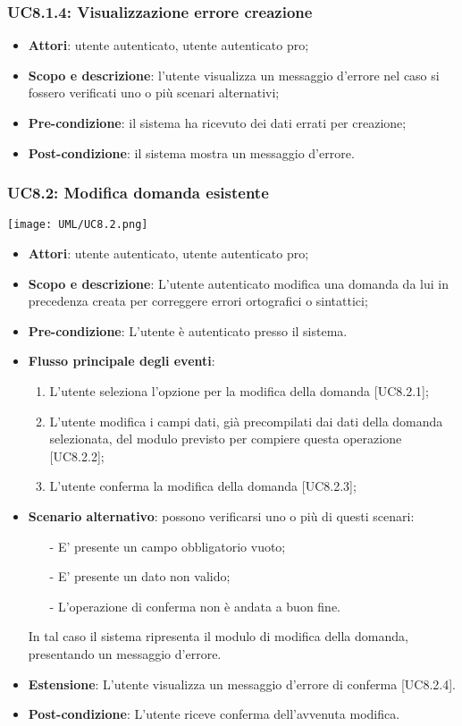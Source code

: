 	\subsubsection{UC8.1.4: Visualizzazione errore creazione}
	\begin{itemize}
		\item
			\textbf{Attori}: utente autenticato, utente autenticato pro;
		\item
			\textbf{Scopo e descrizione}: l'utente visualizza un messaggio d'errore nel caso si fossero verificati uno o più scenari alternativi;
		\item		
			\textbf{Pre-condizione}: il sistema ha ricevuto dei dati errati per creazione;
		\item
			\textbf{Post-condizione}: il sistema mostra un messaggio d'errore.
	\end{itemize}	
	\subsubsection{UC8.2: Modifica domanda esistente}
	\begin{center}
		\texttt{[image: UML/UC8.2.png]}
	\end{center}
	\begin{itemize}
		\item
			\textbf{Attori}: utente autenticato, utente autenticato pro;
		\item		
			\textbf{Scopo e descrizione}: L'utente autenticato modifica una domanda da lui in precedenza creata per correggere errori ortografici o sintattici;
		\item
			\textbf{Pre-condizione}: L'utente è autenticato presso il sistema. 
		\item
			\textbf{Flusso principale degli eventi}:
	       		\begin{enumerate}
					\item 	
					L'utente seleziona l'opzione per la modifica della domanda [UC8.2.1];
					\item
					L'utente modifica i campi dati, già precompilati dai dati della domanda selezionata, del modulo previsto per compiere questa operazione [UC8.2.2];
					\item
					L'utente conferma la modifica della domanda [UC8.2.3];
	 			\end{enumerate}
	 	\item
	 		\textbf{Scenario alternativo}: possono verificarsi uno o più di questi scenari:
				\begin{itemize}
					\item[-] 	
						E' presente un campo obbligatorio vuoto;
					\item[-] 
    						E' presente  un dato non valido;
					\item[-] 
						L'operazione di conferma non è andata a buon fine.
				\end{itemize}
			In tal caso il sistema ripresenta il modulo di modifica della domanda, presentando un messaggio d'errore.
		\item
			\textbf{Estensione}: L'utente visualizza un messaggio d'errore di conferma [UC8.2.4].
		\item
			\textbf{	Post-condizione}: L'utente riceve conferma dell'avvenuta modifica.
	\end{itemize}
